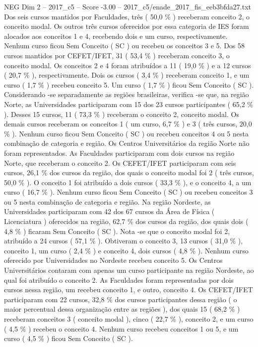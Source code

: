 \begin{textsample}{NEG Dim 2 – 2017\_c5 – Score -3.00 – 2017\_c5/enade\_2017\_fis\_eeb3bfda27.txt}
Dos seis cursos mantidos por Faculdades, três ( 50,0 \% ) receberam conceito 2, o conceito modal.
Os outros três cursos oferecidos por essa categoria de IES foram alocados aos conceitos 1 e 4, recebendo dois e um curso, respectivamente.
Nenhum curso ficou Sem Conceito ( SC ) ou recebeu os conceitos 3 e 5.
Dos 58 cursos mantidos por CEFET/IFET, 31 ( 53,4 \% ) receberam conceito 3, o conceito modal.
Os conceitos 2 e 4 foram atribuídos a 11 ( 19,0 \% ) e a 12 cursos ( 20,7 \% ), respectivamente.
Dois os cursos ( 3,4 \% ) receberam conceito 1, e um curso ( 1,7 \% ) recebeu conceito 5.
Um curso ( 1,7 \% ) ficou Sem Conceito ( SC ).
Considerando -se separadamente as regiões brasileiras, verifica -se que, na região Norte, as Universidades participaram com 15 dos 23 cursos participantes ( 65,2 \% ).
Desses 15 cursos, 11 ( 73,3 \% ) receberam o conceito 2, conceito modal.
Os demais cursos receberam os conceitos 1 ( um curso, 6,7 \% ) e 3 ( três cursos, 20,0 \% ).
Nenhum curso ficou Sem Conceito ( SC ) ou recebeu conceitos 4 ou 5 nesta combinação de categoria e região.
Os Centros Universitários da região Norte não foram representados.
As Faculdades participaram com dois cursos na região Norte, que receberam o conceito 2.
Os CEFET/IFET participaram com seis cursos, 26,1 \% dos cursos da região, dos quais o conceito modal foi 2 ( três cursos, 50,0 \% ).
O conceito 1 foi atribuído a dois cursos ( 33,3 \% ), e o conceito 4, a um curso ( 16,7 \% ).
Nenhum curso ficou Sem Conceito ( SC ) ou recebeu conceitos 3 ou 5 nesta combinação de categoria e região.
Na região Nordeste, as Universidades participaram com 42 dos 67 cursos da Área de Física ( Licenciatura ) oferecidos na região, 62,7 \% dos cursos da região, dos quais dois ( 4,8 \% ) ficaram Sem Conceito ( SC ).
Nota -se que o conceito modal foi 2, atribuído a 24 cursos ( 57,1 \% ).
Obtiveram o conceito 3, 13 cursos ( 31,0 \% ), conceito 1, um curso ( 2,4 \% ) e conceito 4, dois cursos ( 4,8 \% ).
Nenhum curso oferecido por Universidades no Nordeste recebeu conceito 5.
Os Centros Universitários contaram com apenas um curso participante na região Nordeste, ao qual foi atribuído o conceito 2.
As Faculdades foram representadas por dois cursos nessa região, um recebeu conceito 1, e outro, conceito 4.
Os CEFET/IFET participaram com 22 cursos, 32,8 \% dos cursos participantes dessa região ( o maior percentual dessa organização entre as regiões ), dos quais 15 ( 68,2 \% ) receberam conceitos 3 ( conceito modal ), cinco ( 22,7 \% ), conceito 2, e um curso ( 4,5 \% ) recebeu o conceito 4.
Nenhum curso recebeu conceitos 1 ou 5, e um curso ( 4,5 \% ) ficou Sem Conceito ( SC ).

\end{textsample}
